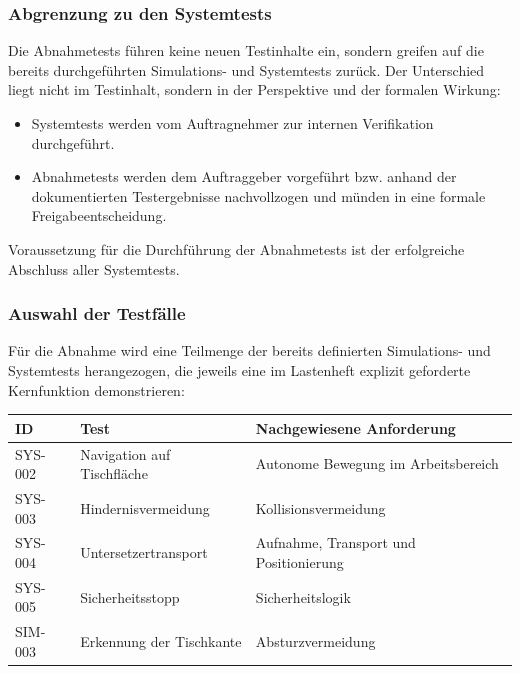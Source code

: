 \documentclass[
  a4paper,
  12pt,
  DIV=12,        %
  parskip=half,  %
  headings=small %
]{scrartcl}
\theoremstyle{definition}
\providecommand{\tightlist}{%
  \setlength{\itemsep}{0pt}\setlength{\parskip}{0pt}}
\theoremstyle{definition}
\begin{document}
\subsubsection{Abgrenzung zu den
Systemtests}\label{abgrenzung-zu-den-systemtests}

Die Abnahmetests führen keine neuen Testinhalte ein, sondern greifen auf
die bereits durchgeführten Simulations- und Systemtests zurück. Der
Unterschied liegt nicht im Testinhalt, sondern in der Perspektive und
der formalen Wirkung:

\begin{itemize}
\tightlist
\item
  Systemtests werden vom Auftragnehmer zur internen Verifikation
  durchgeführt.
\item
  Abnahmetests werden dem Auftraggeber vorgeführt bzw. anhand der
  dokumentierten Testergebnisse nachvollzogen und münden in eine formale
  Freigabeentscheidung.
\end{itemize}

Voraussetzung für die Durchführung der Abnahmetests ist der erfolgreiche
Abschluss aller Systemtests.

\subsubsection{Auswahl der Testfälle}\label{auswahl-der-testfuxe4lle}

Für die Abnahme wird eine Teilmenge der bereits definierten Simulations-
und Systemtests herangezogen, die jeweils eine im Lastenheft explizit
geforderte Kernfunktion demonstrieren:

\begin{longtable}[]{@{}
  >{\raggedright\arraybackslash}p{}
  >{\raggedright\arraybackslash}p{}
  >{\raggedright\arraybackslash}p{}@{}}
\toprule\noalign{}
\begin{minipage}[b]{\linewidth}\raggedright
ID
\end{minipage} & \begin{minipage}[b]{\linewidth}\raggedright
Test
\end{minipage} & \begin{minipage}[b]{\linewidth}\raggedright
Nachgewiesene Anforderung
\end{minipage} \\
\midrule\noalign{}
\endhead
\bottomrule\noalign{}
\endlastfoot
SYS-002 & Navigation auf Tischfläche & Autonome Bewegung im
Arbeitsbereich \\
SYS-003 & Hindernisvermeidung & Kollisionsvermeidung \\
SYS-004 & Untersetzertransport & Aufnahme, Transport und
Positionierung \\
SYS-005 & Sicherheitsstopp & Sicherheitslogik \\
SIM-003 & Erkennung der Tischkante & Absturzvermeidung \\
\end{longtable}
\end{document}
